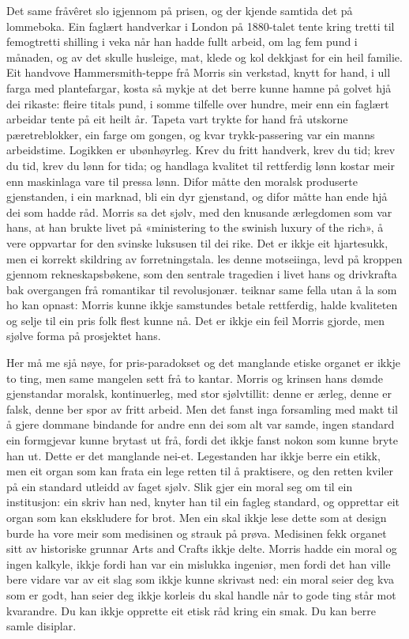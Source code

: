 Det same fråvêret slo igjennom på prisen, og der kjende samtida det på lommeboka. Ein faglært handverkar i London på 1880-talet tente kring tretti til femogtretti shilling i veka når han hadde fullt arbeid, om lag fem pund i månaden, og av det skulle husleige, mat, klede og kol dekkjast for ein heil familie. Eit handvove Hammersmith-teppe frå Morris sin verkstad, knytt for hand, i ull farga med plantefargar, kosta så mykje at det berre kunne hamne på golvet hjå dei rikaste: fleire titals pund, i somme tilfelle over hundre, meir enn ein faglært arbeidar tente på eit heilt år. Tapeta vart trykte for hand frå utskorne pæretreblokker, ein farge om gongen, og kvar trykk-passering var ein manns arbeidstime. Logikken er ubønhøyrleg. Krev du fritt handverk, krev du tid; krev du tid, krev du lønn for tida; og handlaga kvalitet til rettferdig lønn kostar meir enn maskinlaga vare til pressa lønn. Difor måtte den moralsk produserte gjenstanden, i ein marknad, bli ein dyr gjenstand, og difor måtte han ende hjå dei som hadde råd. Morris sa det sjølv, med den knusande ærlegdomen som var hans, at han brukte livet på «ministering to the swinish luxury of the rich», å vere oppvartar for den svinske luksusen til dei rike. Det er ikkje eit hjartesukk, men ei korrekt skildring av forretningstala. \textcite{thompson1955morris} les denne motseiinga, levd på kroppen gjennom rekneskapsbøkene, som den sentrale tragedien i livet hans og drivkrafta bak overgangen frå romantikar til revolusjonær. \textcite{maccarthy1994morris} teiknar same fella utan å la som ho kan opnast: Morris kunne ikkje samstundes betale rettferdig, halde kvaliteten og selje til ein pris folk flest kunne nå. Det er ikkje ein feil Morris gjorde, men sjølve forma på prosjektet hans.

Her må me sjå nøye, for pris-paradokset og det manglande etiske organet er ikkje to ting, men same mangelen sett frå to kantar. Morris og krinsen hans dømde gjenstandar moralsk, kontinuerleg, med stor sjølvtillit: denne er ærleg, denne er falsk, denne ber spor av fritt arbeid. Men det fanst inga forsamling med makt til å gjere dommane bindande for andre enn dei som alt var samde, ingen standard ein formgjevar kunne brytast ut frå, fordi det ikkje fanst nokon som kunne bryte han ut. Dette er det manglande nei-et. Legestanden har ikkje berre ein etikk, men eit organ som kan frata ein lege retten til å praktisere, og den retten kviler på ein standard utleidd av faget sjølv. Slik gjer ein moral seg om til ein institusjon: ein skriv han ned, knyter han til ein fagleg standard, og opprettar eit organ som kan ekskludere for brot. Men ein skal ikkje lese dette som at design burde ha vore meir som medisinen og strauk på prøva. Medisinen fekk organet sitt av historiske grunnar Arts and Crafts ikkje delte. Morris hadde ein moral og ingen kalkyle, ikkje fordi han var ein mislukka ingeniør, men fordi det han ville bere vidare var av eit slag som ikkje kunne skrivast ned: ein moral seier deg kva som er godt, han seier deg ikkje korleis du skal handle når to gode ting står mot kvarandre. Du kan ikkje opprette eit etisk råd kring ein smak. Du kan berre samle disiplar.

